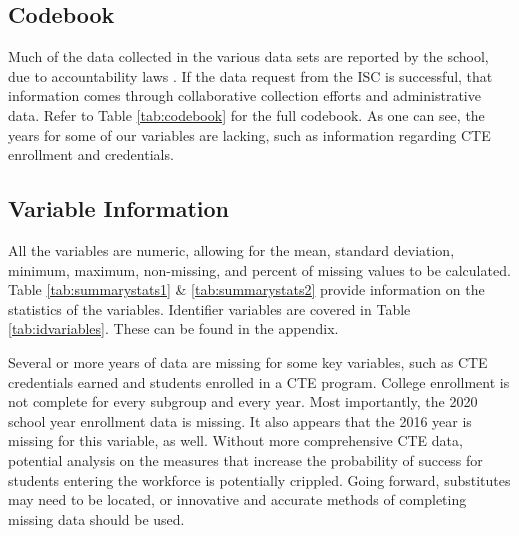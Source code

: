 \subsection{Codebook}
Much of the data collected in the various data sets are reported by the school, due to accountability laws \parencite[][]{NCDPI}. 
If the data request from the ISC is successful, that information comes through collaborative collection efforts and administrative data. Refer to Table \ref{tab:codebook} for the full codebook. As one can see, the years for some of our variables are lacking, such as information regarding CTE enrollment and credentials.

\subsection{Variable Information}
All the variables are numeric, allowing for the mean, standard deviation, minimum, maximum, non-missing, and percent of missing values to be calculated. Table \ref{tab:summarystats1} \& \ref{tab:summarystats2}  provide information on the statistics of the variables. Identifier variables are covered in Table \ref{tab:idvariables}. These can be found in the appendix.

Several or more years of data are missing for some key variables, such as CTE credentials earned and students enrolled in a CTE program. 
College enrollment is not complete for every subgroup and every year. Most importantly, the 2020 school year enrollment data is missing. 
It also appears that the 2016 year is missing for this variable, as well. Without more comprehensive CTE data, potential analysis on the measures that increase the probability of success for students entering the workforce is potentially crippled. 
Going forward, substitutes may need to be located, or innovative and accurate methods of completing missing data should be used. 